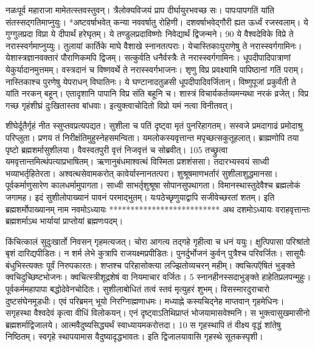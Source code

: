 नळःपूर्व महाराजा मामेतत्स्तवस्तुवन्।
 त्रैलोक्यविजयं प्राप दीर्घायुरभवच्छ सः।
 पापःपापगतिं यांति संतस्सद्गतिमाप्नुयुः।
 *अष्टवर्षाभवेत् कन्या नववर्षातु रोहिणी।
 दशवर्षाभवेद्गौरी ह्यत ऊर्ध्वं रजस्वलाम्।
 ये गुग्गुलप्रदा विप्रा ये दीपार्थं हरेघृतम्।
 ये तण्डुलप्रदाविष्णोः निवेद्यार्थं द्विजन्मने।
 90 ये वैश्वदेविके विप्रे ते नरास्स्वर्गमाप्नुय्युः।
 तुलायां कार्तिके माघे वैशाखे स्नानतत्पराः।
 येचास्तिकाःपुराणेषु ते नरास्स्वर्गगामिनः।
 येशास्त्रज्ञानवक्तारं पौराणिकमपि द्विजम्।
 सत्कुर्वति धनैर्वस्त्रैः ते नरास्स्वर्गगामिनः।
 धूपदीपादिपात्राणां येकुर्यादानमुत्तमम्।
 वस्त्रदानं च विष्णवर्थे ते नरास्स्वर्गभाजनः।
 शृणु विप्र प्रवक्ष्यामि पापिष्ठानां गतिं पराम्।
 नास्तिकाश्च पुरणेषु येपराधन् विघातिनः।
 ये घण्टानादतुळसी धूपदीपादिवर्जितान्।
 विष्णुपूजां प्रकुर्वंती ते यांति नरकन् बहून्।
 एतादृशानि पापानि विप्र संति बहूनि च।
 शास्त्रं विचार्यकर्तव्यमन्यथा नरकं व्रजेत्।
 विप्र गच्छ गृहंशीघ्रं दुःखितास्तव बांधवाः।
 इत्युक्त्वाचोदितो विप्रो यमं नत्वा विनीतवत्।
 
शीघेर्दूतैर्गृहं नीत स्सुप्तवप्रत्यपद्यत।
 सुशीला च पतिं दृष्ट्वा मृतं पुनरिहागतम्।
 सस्वजे प्रमदागाढं प्रमोदाश्रु परिप्लुता।
 प्रणय तं निरीक्षंतिमुहुस्नेहसमन्विता।
 यमलोकस्यवृत्तान्त मपृच्छत्सकुतूहलात्।
 ब्राह्मणोपि तया पृष्टो ब्रह्मशर्मासुशीलया।
 वैवस्वतपुरी वृत्तं निजवृत्तं च सोब्रवीत्।
 105 तच्छ्रुत्वा यमवृत्तान्तमित्थंपत्याप्रभाषितम्।
 ऋणानुबंधमाश्वत्थं विस्मिता प्रशशंससा।
 तदारभ्यस्वयं साध्वी भव्याभर्तृहितेरता।
 अश्वत्थसेवामकरोत् कावेर्यास्नानतत्परा।
 शुश्रूषमाणभर्तारं सुशीलाशुद्धमानसा।
 पूर्वकर्माणुसारेण कालधर्मामुपागता।
 साध्वी साभर्तृशुश्रूषा सोपानसुपथागता।
 विमानस्थास्तुदेवैश्च ब्रह्मलोकं जगामह।
 इदं सुशीलोपाख्यानं पावनं परमाद्भुतम्।
 यःपठेच्छृणुयाद्वापि सजीवेच्छरतां शतम्।
 इति ब्रह्मशर्मोपाख्यानम् नाम नवमोऽध्यायः
**************************
अथ दशमोऽध्यायः
वराहवृत्तान्तः ब्रह्मशर्माऽथ भार्यायां प्राप्तोयां ब्रह्मणःपदम्।

किंचित्कालं सुदुःखार्तो निवसन् गृहमत्यजत्।
 चोरा आगत्य तद्गहे गृहीत्वा च धनं ययुः।
 क्षुत्पिपासा परिश्रांतो बृशं दारिद्यपीडितः।
 न शर्म लेभे कुत्रापि राजयक्ष्मप्रपीडितः।
 पुनर्दुर्भोजनं कुर्वन् पुत्रैश्च परिवर्जितः।
 सासूयैः बंधुभिस्त्यक्तः पूर्वं निरुपकारतः।
 शप्तश्च परिहासोक्त्या लज्झितोव्यचरन् महीम्।
 क्वचित्पऍषितं भुङ्क्ते क्वचिदुच्छिष्टभोजनः।
 क्वचित्स्त्रीशूद्रशेषं वा नियमाचार वर्जितः।
 5 स्नानहीनस्सदाभुङ्क्ते हाहेतिप्रलपन्मुहुः।
 पूर्वकर्ममहापापा बद्धोदेवेनचोदितः।
 सुशीलाबोधितं तत्वं स्तवं मृत्युहरं शुभम्।
 विसस्मारदुराचारो दुष्टसंघेनमूडधीः।
 एवं परिब्रमन् भूयो निरग्निाह्मणाधमः।
 मध्याह्ने कस्यचिद्नेह माप्तवान् गृहमेधिनः।
 सगृहस्था वैश्वदेवं कृत्वा वीधिं विलोकयन्।
 एनं दृष्ट्वाऽतिथिप्राप्तं भोजयामासवेश्मनि।
 स भुक्त्वासुखमासीनो ब्रह्मशर्माद्विजालये।
 आत्मवैदुष्यसिद्ध्यर्थं स्वाध्यायमकरोत्तदा।
 10 स गृहस्थापि तं वीक्ष्य वृद्धं शांतेषु निष्ठितम्।
 स्वगृहे स्थापयामास वैदुष्यादृद्धभावतः।
 इति द्विजालयावासि गृहस्थे सूतकस्पृशी।
 
